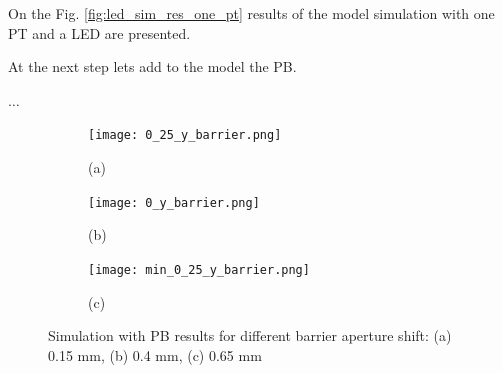 On the Fig. \ref*{fig:led_sim_res_one_pt} results of the model simulation with one PT and a LED are presented.

At the next step lets add to the model the PB.

$\hdots$

\begin{figure}[H]

\end{figure}

\begin{figure}[H]
  \centering
  \begin{subfigure}[b]{0.3\textwidth}
    \texttt{[image: 0\_25\_y\_barrier.png]}
    \centering
    \label{fig:0_25_y_barrier}
    \caption*{(a)}
  \end{subfigure}
  \begin{subfigure}[b]{0.3\textwidth}
    \texttt{[image: 0\_y\_barrier.png]}
    \label{fig:0_y_barrier}
    \caption*{(b)}
  \end{subfigure}
  \begin{subfigure}[b]{0.3\textwidth}
    \texttt{[image: min\_0\_25\_y\_barrier.png]}
    \label{fig:min_0_25_y_barrier}
    \caption*{(c)}
  \end{subfigure}
  \caption{Simulation with PB results for different barrier aperture shift: (a) 0.15 mm, (b) 0.4 mm, (c) 0.65 mm}
  \label{fig:LED_PT_sim_bar}
\end{figure}

    
    



